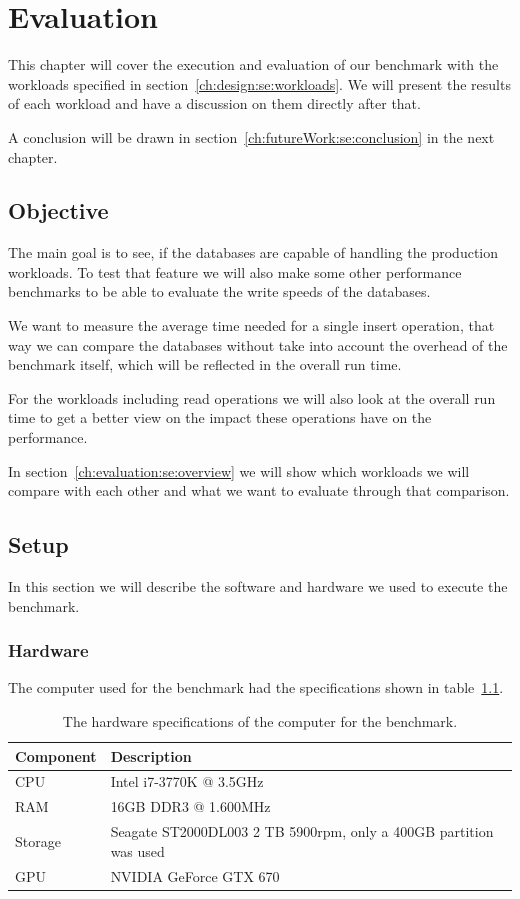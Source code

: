 \chapter{Evaluation}
\label{ch:evaluation}
This chapter will cover the execution and evaluation of our benchmark with the workloads specified in section~\ref{ch:design:se:workloads}.
We will present the results of each workload and have a discussion on them directly after that.

A conclusion will be drawn in section~\ref{ch:futureWork:se:conclusion} in the next chapter.

\section{Objective}
The main goal is to see,
if the databases are capable of handling the production workloads.
To test that feature we will also make some other performance benchmarks to be able to evaluate the write speeds of the databases.

We want to measure the average time needed for a single insert operation,
that way we can compare the databases without take into account the overhead of the benchmark itself,
which will be reflected in the overall run time.

For the workloads including read operations we will also look at the overall run time to get a better view on the impact these operations have on the performance.

In section~\ref{ch:evaluation:se:overview} we will show which workloads we will compare with each other and what we want to evaluate through that comparison.

\section{Setup}
In this section we will describe the software and hardware we used to execute the benchmark.

\subsection{Hardware}
The computer used for the benchmark had the specifications shown in table~\ref{tab:hardware}.

\begin{table}[!h]
  \begin{minipage}{\textwidth}
    \begin{tabularx}{\textwidth}{ | l | X | }
      \hline
      Component & Description \\ \hline \hline
      CPU & Intel i7-3770K @ 3.5GHz \\ \hline
      RAM & 16GB DDR3 @ 1.600MHz \\ \hline
      Storage & Seagate ST2000DL003 2 TB 5900rpm, only a 400GB partition was used \\ \hline
      GPU & NVIDIA GeForce GTX 670 \\ \hline
    \end{tabularx}
  \end{minipage}
  \caption{The hardware specifications of the computer for the benchmark.}
  \label{tab:hardware}
\end{table}

